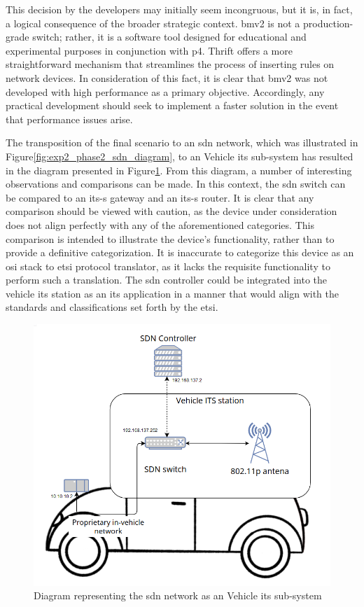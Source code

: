 This decision by the developers may initially seem incongruous, but it is, in fact, a logical consequence of the broader strategic context. \gls{bmv2} is not a production-grade switch; rather, it is a software tool designed for educational and experimental purposes in conjunction with \gls{p4}. Thrift offers a more straightforward mechanism that streamlines the process of inserting rules on network devices. 
In consideration of this fact, it is clear that \gls{bmv2} was not developed with high performance as a primary objective. Accordingly, any practical development should seek to implement a faster solution in the event that performance issues arise.

The transposition of the final scenario to an \gls{sdn} network, which was illustrated in Figure\ref{fig:exp2_phase2_sdn_diagram}, to an Vehicle \gls{its} sub-system has resulted in the diagram presented in Figure\ref{fig:exp2_vehicle_subsystem}. From this diagram, a number of interesting observations and comparisons can be made. 
In this context, the \gls{sdn} switch can be compared to an \gls{its-s} gateway and an \gls{its-s} router. It is clear that any comparison should be viewed with caution, as the device under consideration does not align perfectly with any of the aforementioned categories. This comparison is intended to illustrate the device's functionality, rather than to provide a definitive categorization. It is inaccurate to categorize this device as an \gls{osi} stack to \gls{etsi} protocol translator, as it lacks the requisite functionality to perform such a translation.
The \gls{sdn} controller could be integrated into the vehicle \gls{its} station as an \gls{its} application in a manner that would align with the standards and classifications set forth by the \gls{etsi}.

\begin{figure}
	\centering
	\includegraphics[width=\textwidth]{Chapters/Figures/tests/bmv2_phase_2/its_vehicle_diagram.PNG}
	\caption{Diagram representing the \gls{sdn} network as an Vehicle \gls{its} sub-system}
	\label{fig:exp2_vehicle_subsystem}
\end{figure}

